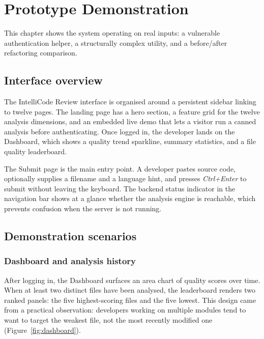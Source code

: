 \documentclass[12pt, oneside]{report}
\begin{document}
\chapter{Prototype Demonstration}
\label{ch:demo}

This chapter shows the system operating on real inputs: a vulnerable authentication helper, a structurally complex utility, and a before/after refactoring comparison.

\section{Interface overview}
\label{sec:ui-overview}

The IntelliCode Review interface is organised around a persistent sidebar linking to twelve
pages. The landing page has a hero section, a feature grid for the twelve analysis dimensions,
and an embedded live demo that lets a visitor run a canned analysis before authenticating.
Once logged in, the developer lands on the Dashboard, which shows a quality trend sparkline,
summary statistics, and a file quality leaderboard.

The Submit page is the main entry point. A developer pastes source code, optionally supplies
a filename and a language hint, and presses \textit{Ctrl+Enter} to submit without leaving
the keyboard. The backend status indicator in the navigation bar shows at a glance whether
the analysis engine is reachable, which prevents confusion when the server is not running.

\section{Demonstration scenarios}
\label{sec:demo-scenarios}

\subsection{Dashboard and analysis history}

After logging in, the Dashboard surfaces an area chart of quality scores over time.
When at least two distinct files have been analysed, the leaderboard renders two ranked
panels: the five highest-scoring files and the five lowest. This design came from a
practical observation: developers working on multiple modules tend to want to target the
weakest file, not the most recently modified one (Figure~\ref{fig:dashboard}).
\end{document}
